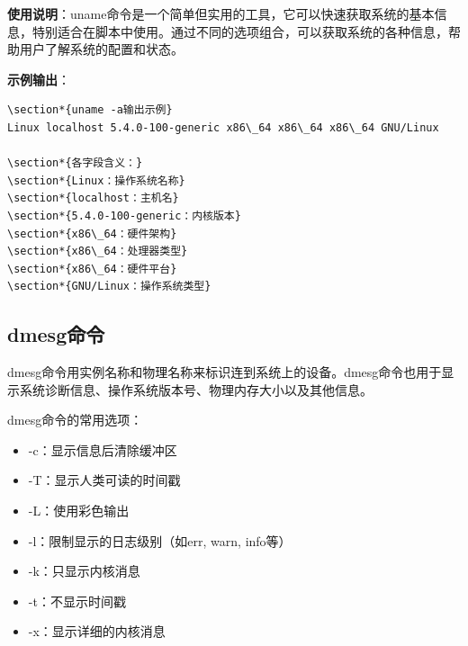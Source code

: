 \documentclass[12pt,UTF8]{ctexbook}
\begin{document}
\textbf{使用说明}：uname命令是一个简单但实用的工具，它可以快速获取系统的基本信息，特别适合在脚本中使用。通过不同的选项组合，可以获取系统的各种信息，帮助用户了解系统的配置和状态。

\textbf{示例输出}：
\begin{verbatim}
\section*{uname -a输出示例}
Linux localhost 5.4.0-100-generic x86\_64 x86\_64 x86\_64 GNU/Linux

\section*{各字段含义：}
\section*{Linux：操作系统名称}
\section*{localhost：主机名}
\section*{5.4.0-100-generic：内核版本}
\section*{x86\_64：硬件架构}
\section*{x86\_64：处理器类型}
\section*{x86\_64：硬件平台}
\section*{GNU/Linux：操作系统类型}
\end{verbatim}

\subsection{dmesg命令}
dmesg命令用实例名称和物理名称来标识连到系统上的设备。dmesg命令也用于显示系统诊断信息、操作系统版本号、物理内存大小以及其他信息。

dmesg命令的常用选项：
\begin{itemize}
    \item -c：显示信息后清除缓冲区
    \item -T：显示人类可读的时间戳
    \item -L：使用彩色输出
    \item -l：限制显示的日志级别（如err, warn, info等）
    \item -k：只显示内核消息
    \item -t：不显示时间戳
    \item -x：显示详细的内核消息
\end{itemize}
\end{document}
